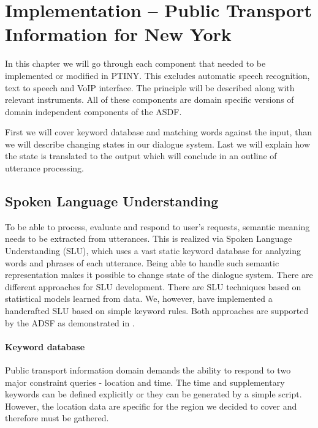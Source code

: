 \chapter{Implementation -- Public Transport Information for New York}

In this chapter we will go through each component that needed to be implemented or modified in PTINY.
This excludes automatic speech recognition, text to speech and VoIP interface.
The principle will be described along with relevant instruments. %
All of these components are domain specific versions of domain independent components of the ASDF.

First we will cover keyword database and matching words against the input, than we will describe changing states in our dialogue system.
Last we will explain how the state is translated to the output which will conclude in an outline of utterance processing. %

\section{Spoken Language Understanding}

To be able to process, evaluate and respond to user's requests, semantic meaning needs to be extracted from utterances. %
This is realized via Spoken Language Understanding (SLU), which uses a vast static keyword database for analyzing words and phrases of each utterance.
Being able to handle such semantic representation makes it possible to change state of the dialogue system.
There are different approaches for SLU development.
There are SLU techniques based on statistical models learned from data.
We, however, have implemented a handcrafted SLU based on simple keyword rules.
Both approaches are supported by the ADSF as demonstrated in \cite{slu}.


\subsubsection{Keyword database} 

Public transport information domain demands the ability to respond to two major constraint queries - location and time.
The time and supplementary keywords can be defined explicitly or they can be generated by a simple script.
However, the location data are specific for the region we decided to cover and therefore must be gathered.

